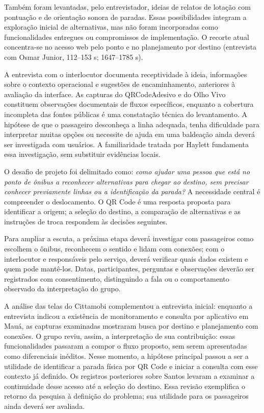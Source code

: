 \documentclass[12pt,oneside,a4paper,brazil,chapter=TITLE]{abntex2}
\begin{document}
Também foram levantadas, pelo entrevistador, ideias de relatos de lotação com pontuação e de orientação sonora de paradas. Essas possibilidades integram a exploração inicial de alternativas, mas não foram incorporadas como funcionalidades entregues ou compromissos de implementação. O recorte atual concentra-se no acesso web pelo ponto e no planejamento por destino  (entrevista com Osmar Junior, 112--153 s; 1647--1785 s).


A entrevista com o interlocutor documenta receptividade à ideia, informações sobre o contexto operacional e sugestões de encaminhamento, anteriores à avaliação da interface. As capturas do QRCodeAdesivo e do Olho Vivo constituem observações documentais de fluxos específicos, enquanto a cobertura incompleta das fontes públicas é uma constatação técnica do levantamento. A hipótese de que o passageiro desconheça a linha adequada, tenha dificuldade para interpretar muitas opções ou necessite de ajuda em uma baldeação ainda deverá ser investigada com usuários. A familiaridade tratada por Haylett fundamenta essa investigação, sem substituir evidências locais.

O desafio de projeto foi delimitado como: \textit{como ajudar uma pessoa que está no ponto de ônibus a reconhecer alternativas para chegar ao destino, sem precisar conhecer previamente linhas ou a identificação da parada?} A necessidade central é compreender o deslocamento. O QR Code é uma resposta proposta para identificar a origem; a seleção do destino, a comparação de alternativas e as instruções de troca respondem às decisões seguintes.

Para ampliar a escuta, a próxima etapa deverá investigar com passageiros como escolhem o ônibus, reconhecem o sentido e lidam com conexões; com o interlocutor e responsáveis pelo serviço, deverá verificar quais dados existem e quem pode mantê-los. Datas, participantes, perguntas e observações deverão ser registrados com consentimento, distinguindo a fala ou o comportamento observado da interpretação do grupo.

A análise das telas do Cittamobi complementou a entrevista inicial: enquanto a entrevista indicou a existência de monitoramento e consulta por aplicativo em Mauá, as capturas examinadas mostraram busca por destino e planejamento com conexões. O grupo reviu, assim, a interpretação de sua contribuição: essas funcionalidades passaram a compor o fluxo proposto, sem serem apresentadas como diferenciais inéditos. Nesse momento, a hipótese principal passou a ser a utilidade de identificar a parada física por QR Code e iniciar a consulta com esse contexto já definido. Os registros posteriores sobre Santos levaram a examinar a continuidade desse acesso até a seleção do destino. Essa revisão exemplifica o retorno da pesquisa à definição do problema; sua utilidade para os passageiros ainda deverá ser avaliada.
\end{document}
